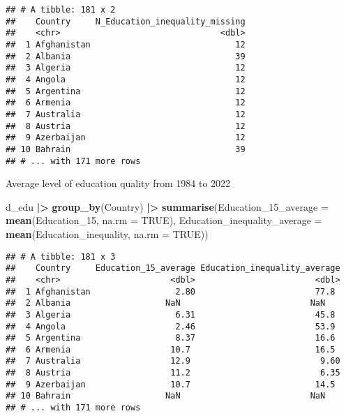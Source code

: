 \documentclass[
]{article}
\newenvironment{Shaded}{\begin{snugshade}}{\end{snugshade}}
\newcommand{\AttributeTok}[1]{\textcolor[rgb]{0.13,0.29,0.53}{#1}}
\newcommand{\ConstantTok}[1]{\textcolor[rgb]{0.56,0.35,0.01}{#1}}
\newcommand{\FunctionTok}[1]{\textcolor[rgb]{0.13,0.29,0.53}{\textbf{#1}}}
\newcommand{\NormalTok}[1]{#1}
\newcommand{\SpecialCharTok}[1]{\textcolor[rgb]{0.81,0.36,0.00}{\textbf{#1}}}
\begin{document}
\begin{verbatim}
## # A tibble: 181 x 2
##    Country     N_Education_inequality_missing
##    <chr>                                <dbl>
##  1 Afghanistan                             12
##  2 Albania                                 39
##  3 Algeria                                 12
##  4 Angola                                  12
##  5 Argentina                               12
##  6 Armenia                                 12
##  7 Australia                               12
##  8 Austria                                 12
##  9 Azerbaijan                              12
## 10 Bahrain                                 39
## # ... with 171 more rows
\end{verbatim}

Average level of education quality from 1984 to 2022

\begin{Shaded}
\begin{Highlighting}[]
\NormalTok{d\_edu }\SpecialCharTok{|\textgreater{}}
  \FunctionTok{group\_by}\NormalTok{(Country) }\SpecialCharTok{|\textgreater{}}
  \FunctionTok{summarise}\NormalTok{(}\AttributeTok{Education\_15\_average =} \FunctionTok{mean}\NormalTok{(Education\_15, }\AttributeTok{na.rm =} \ConstantTok{TRUE}\NormalTok{),}
            \AttributeTok{Education\_inequality\_average =} \FunctionTok{mean}\NormalTok{(Education\_inequality, }\AttributeTok{na.rm =} \ConstantTok{TRUE}\NormalTok{))}
\end{Highlighting}
\end{Shaded}

\begin{verbatim}
## # A tibble: 181 x 3
##    Country     Education_15_average Education_inequality_average
##    <chr>                      <dbl>                        <dbl>
##  1 Afghanistan                 2.80                        77.8 
##  2 Albania                   NaN                          NaN   
##  3 Algeria                     6.31                        45.8 
##  4 Angola                      2.46                        53.9 
##  5 Argentina                   8.37                        16.6 
##  6 Armenia                    10.7                         16.5 
##  7 Australia                  12.9                          9.60
##  8 Austria                    11.2                          6.35
##  9 Azerbaijan                 10.7                         14.5 
## 10 Bahrain                   NaN                          NaN   
## # ... with 171 more rows
\end{verbatim}
\end{document}
